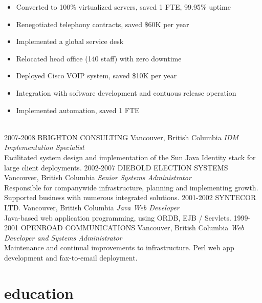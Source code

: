 \documentclass[]{friggeri-cv} %
\begin{document}
\begin{entrylist}
{\begin{itemize}
\item Converted to 100\% virtualized servers, saved 1 FTE, 99.95\% uptime
\item Renegotiated telephony contracts, saved \$60K per year
\item Implemented a global service desk
\item Relocated head office (140 staff) with zero downtime
\item Deployed Cisco VOIP system, saved \$10K per year
\item Integration with software development and contuous release operation
\item Implemented automation, saved 1 FTE
\end{itemize}}
\\
\entry
{2007-2008}
{BRIGHTON CONSULTING}
{Vancouver, British Columbia}
{\emph{IDM Implementation Specialist} \\
Facilitated system design and implementation of the Sun Java Identity stack for large client deployments.}
\entry
{2002-2007}
{DIEBOLD ELECTION SYSTEMS}
{Vancouver, British Columbia}
{\emph{Senior Systems Administrator} \\
Responsible for companywide infrastructure, planning and implementing growth. Supported business with numerous integrated solutions.}
\entry
{2001-2002}
{SYNTECOR LTD.}
{Vancouver, British Columbia}
{\emph{Java Web Developer} \\
Java-based web application programming, using ORDB, EJB / Servlets.}
\entry
{1999-2001}
{OPENROAD COMMUNICATIONS}
{Vancouver, British Columbia}
{\emph{Web Developer and Systems Administrator} \\
Maintenance and continual improvements to infrastructure. Perl web app development and fax-to-email deployment.}
\end{entrylist}


\section{education}
\end{document}

